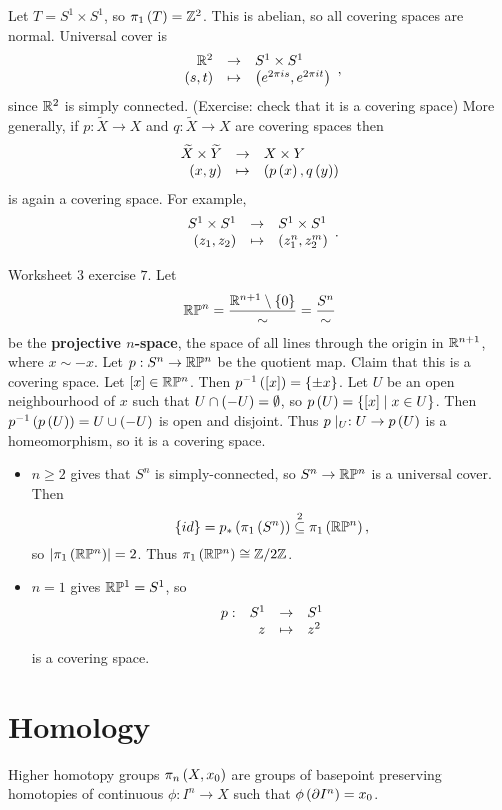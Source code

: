 \begin{example*}
Let $ T = S^1 \times S^1 $, so $ \pi_1\left( T \right) = \mathbb{Z}^2 $. This is abelian, so all covering spaces are normal. Universal cover is
$$ \function{\R^2}{S^1 \times S^1}{\rb{s, t}}{\rb{e^{2\pi is}, e^{2\pi it}}}, $$
since $ \mathbb{R}^2 $ is simply connected. (Exercise: check that it is a covering space) More generally, if $ p : \widetilde{X} \to X $ and $ q : \widetilde{X} \to X $ are covering spaces then
$$ \function{\widetilde{X} \times \widetilde{Y}}{X \times Y}{\rb{x, y}}{\rb{p\rb{x}, q\rb{y}}} $$
is again a covering space. For example,
$$ \function{S^1 \times S^1}{S^1 \times S^1}{\rb{z_1, z_2}}{\rb{z_1^n, z_2^m}}. $$
\end{example*}

\begin{example*}
Worksheet $ 3 $ exercise $ 7 $. Let
$$ \mathbb{R}\mathbb{P}^n = \dfrac{\mathbb{R}^{n + 1} \setminus \left\{ 0 \right\}}{\sim} = \dfrac{S^n}{\sim} $$
be the \textbf{projective $ n $-space}, the space of all lines through the origin in $ \mathbb{R}^{n + 1} $, where $ x \sim -x $. Let $ p : S^n \to \mathbb{R}\mathbb{P}^n $ be the quotient map. Claim that this is a covering space. Let $ \left[ x \right] \in \mathbb{R}\mathbb{P}^n $. Then $ p^{-1}\left( \left[ x \right] \right) = \left\{ \pm x \right\} $. Let $ U $ be an open neighbourhood of $ x $ such that $ U \cap \left( -U \right) = \emptyset $, so $ p\left( U \right) = \left\{ \left[ x \right] \mid x \in U \right\} $. Then $ p^{-1}\left( p\left( U \right) \right) = U \cup \left( -U \right) $ is open and disjoint. Thus $ p \mid_U : U \to p\left( U \right) $ is a homeomorphism, so it is a covering space.
\begin{itemize}
\item $ n \ge 2 $ gives that $ S^n $ is simply-connected, so $ S^n \to \mathbb{R}\mathbb{P}^n $ is a universal cover. Then
$$ \left\{ id \right\} = p_*\left( \pi_1\left( S^n \right) \right) \overset{2}{\subseteq} \pi_1\left( \mathbb{R}\mathbb{P}^n \right), $$
so $ \left\lvert \pi_1\left( \mathbb{R}\mathbb{P}^n \right) \right\rvert = 2 $. Thus $ \pi_1\left( \mathbb{R}\mathbb{P}^n \right) \cong \mathbb{Z} / 2\mathbb{Z} $.
\item $ n = 1 $ gives $ \mathbb{R}\mathbb{P}^1 = S^1 $, so
$$ \function[p]{S^1}{S^1}{z}{z^2} $$
is a covering space.
\end{itemize}
\end{example*}

\pagebreak

\section{Homology}


Higher homotopy groups $ \pi_n\left( X, x_0 \right) $ are groups of basepoint preserving homotopies of continuous $ \phi : I^n \to X $ such that $ \phi\left( \partial I^n \right) = x_0 $.

